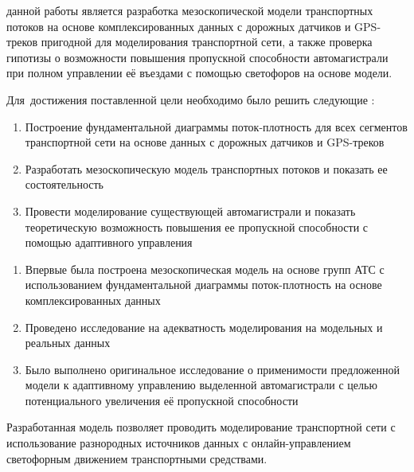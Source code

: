 \ifsynopsis

\else

\fi


{\aim} данной работы является разработка мезоскопической модели транспортных потоков на основе комплексированных данных с дорожных датчиков и GPS-треков пригодной для моделирования транспортной сети, а также проверка гипотизы о возможности повышения пропускной способности автомагистрали при полном управлении её въездами с помощью светофоров на основе модели.

Для~достижения поставленной цели необходимо было решить следующие {\tasks}:
\begin{enumerate}[beginpenalty=10000] %
  \item Построение фундаментальной диаграммы поток-плотность для всех сегментов транспортной сети на основе данных с дорожных датчиков и GPS-треков
  \item Разработать мезоскопическую модель транспортных потоков и показать ее состоятельность
  \item Провести моделирование существующей автомагистрали и показать теоретическую возможность повышения ее пропускной способности с помощью адаптивного управления
\end{enumerate}


{\novelty}
\begin{enumerate}[beginpenalty=10000] %
  \item Впервые была построена мезоскопическая модель на основе групп АТС с использованием фундаментальной диаграммы поток-плотность на основе комплексированных данных
  \item Проведено исследование на адекватность моделирования на модельных и реальных данных
  \item Было выполнено оригинальное исследование о применимости предложенной модели к адаптивному управлению выделенной автомагистрали с целью потенциального увеличения её пропускной способности
\end{enumerate}

{\influence} Разработанная модель позволяет проводить моделирование транспортной сети с использование разнородных источников данных с онлайн-управлением светофорным движением транспортными средствами.

